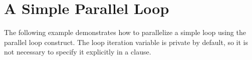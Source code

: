 \pagebreak
\section{A Simple Parallel Loop}
\label{sec:ploop}

The following example demonstrates how to parallelize a simple loop using the parallel 
loop construct. The loop iteration variable is private by default, so it is not 
necessary to specify it explicitly in a  clause.




